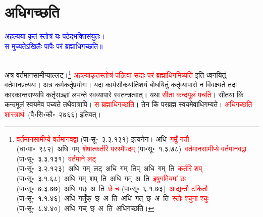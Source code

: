 \section[अधिगच्छति]{अधिगच्छति}
\centering\textcolor{blue}{अहल्यया कृतं स्तोत्रं यः पठेद्भक्तिसंयुतः।\nopagebreak\\
स मुच्यतेऽखिलैः पापैः परं ब्रह्माधिगच्छति॥}\nopagebreak\\
\\
\fontsize{14}{21}\selectfont\begin{sloppypar}\justifying\noindent\hspace{10mm} अत्र वर्तमान\-सामीप्याल्लट्।\footnote{\textcolor{red}{वर्तमान\-सामीप्ये वर्तमानवद्वा} (पा॰सू॰~३.३.१३१) इत्यनेन। अधि~\textcolor{red}{गमॢँ गतौ} (धा॰पा॰~९८२)~\arrow अधि~गम्~\arrow \textcolor{red}{शेषात्कर्तरि परस्मैपदम्} (पा॰सू॰~१.३.७८)~\arrow \textcolor{red}{वर्तमान\-सामीप्ये वर्तमानवद्वा} (पा॰सू॰~३.३.१३१)~\arrow \textcolor{red}{वर्तमाने लट्} (पा॰सू॰~३.२.१२३)~\arrow अधि~गम्~लट्~\arrow अधि~गम्~तिप्~\arrow अधि~गम्~ति~\arrow \textcolor{red}{कर्तरि शप्} (पा॰सू॰~३.१.६८)~\arrow अधि~गम्~शप्~ति~\arrow अधि~गम्~अ~ति~\arrow \textcolor{red}{इषुगमियमां छः} (पा॰सू॰~७.३.७७)~\arrow अधि~गछ्~अ~ति~\arrow \textcolor{red}{छे च} (पा॰सू॰~६.१.७३)~\arrow \textcolor{red}{आद्यन्तौ टकितौ} (पा॰सू॰~१.१.४६)~\arrow अधि~गतुँक्~छ्~अ~ति~\arrow अधि~गत्~छ्~अ~ति~\arrow \textcolor{red}{स्तोः श्चुना श्चुः} (पा॰सू॰~८.४.४०)~\arrow अधि~गच्~छ्~अ~ति~\arrow अधिगच्छति।} \textcolor{red}{अहल्या\-कृत\-स्तोत्रं पठित्वा सद्यः परं ब्रह्माधि\-गमिष्यति} इति ध्वनयितुं वर्तमान\-प्रत्ययः। अत्र कर्म\-कर्तृ\-प्रयोगः। यदा कार्य\-सौकर्यातिशयं बोधयितुं कर्तृ\-व्यापारो न विवक्ष्यते तदा कारकान्तराण्यपि कर्तृ\-सञ्ज्ञां लभन्ते स्व\-व्यापारे स्वतन्त्रत्वात्। यथा \textcolor{red}{सीता कन्द\-मूलं पचति}। सीतया किं कन्द\-मूलं स्वयमेव पच्यते तथैवात्रापि। \textcolor{red}{स ब्रह्माधिगच्छति}। तेन किं पर\-ब्रह्म स्वयमेवाधिगम्यते। \textcolor{red}{अधिगच्छति शास्त्रार्थः} (वै॰सि॰कौ॰~२७६६) इतिवत्।
\end{sloppypar}
